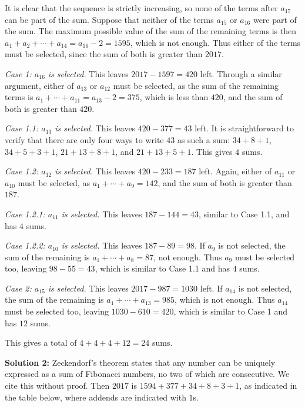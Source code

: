 \documentclass[11pt,paper=letter]{scrartcl}
\begin{document}
\begin{enumerate}[left=0pt]
\newpage

It is clear that the sequence is strictly increasing, so none of the terms after $a_{17}$ can be part of the sum. Suppose that neither of the terms $a_{15}$ or $a_{16}$ were part of the sum. The maximum possible value of the sum of the remaining terms is then $a_1 + a_2 + \cdots + a_{14} = a_{16} - 2 = 1595$, which is not enough. Thus either of the terms must be selected, since the sum of both is greater than $2017$.

\emph{Case 1: $a_{16}$ is selected.} This leaves $2017 - 1597 = 420$ left. Through a similar argument, either of $a_{13}$ or $a_{12}$ must be selected, as the sum of the remaining terms is $a_1 + \cdots + a_{11} = a_{13} - 2 = 375$, which is less than $420$, and the sum of both is greater than $420$.

\emph{Case 1.1: $a_{13}$ is selected.} This leaves $420 - 377 = 43$ left. It is straightforward to verify that there are only four ways to write $43$ as such a sum: $34 + 8 + 1$, $34 + 5 + 3 + 1$, $21 + 13 + 8 + 1$, and $21 + 13 + 5 + 1$. This gives $4$ sums.

\emph{Case 1.2: $a_{12}$ is selected.} This leaves $420 - 233 = 187$ left. Again, either of $a_{11}$ or $a_{10}$ must be selected, as $a_1 + \cdots + a_9 = 142$, and the sum of both is greater than $187$.

\emph{Case 1.2.1: $a_{11}$ is selected.} This leaves $187 - 144 = 43$, similar to Case 1.1, and has $4$ sums.

\emph{Case 1.2.2: $a_{10}$ is selected.} This leaves $187 - 89 = 98$. If $a_9$ is not selected, the sum of the remaining is $a_1 + \cdots + a_8 = 87$, not enough. Thus $a_9$ must be selected too, leaving $98 - 55 = 43$, which is similar to Case 1.1 and has $4$ sums.

\emph{Case 2: $a_{15}$ is selected.} This leaves $2017 - 987 = 1030$ left. If $a_{14}$ is not selected, the sum of the remaining is $a_1 + \cdots + a_{13} = 985$, which is not enough. Thus $a_{14}$ must be selected too, leaving $1030 - 610 = 420$, which is similar to Case 1 and has $12$ sums.

This gives a total of $4+4+4+12 = 24$ sums.

\textbf{Solution 2:} Zeckendorf's theorem states that any number can be uniquely expressed as a sum of Fibonacci numbers, no two of which are consecutive. We cite this without proof. Then $2017$ is $1594+377+34+8+3+1$, as indicated in the table below, where addends are indicated with $1$s.


\end{enumerate}
\end{document}
